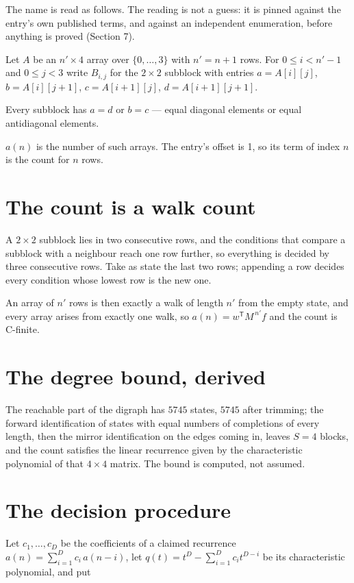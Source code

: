 \documentclass[11pt]{article}
\theoremstyle{definition}
\begin{document}
The name is read as follows. The reading is not a guess: it is pinned against the entry's own published terms, and against an independent enumeration, before anything is proved (Section 7).

Let $A$ be an $n' \times 4$ array over $\{0,\dots,3\}$ with $n' = n + 1$ rows. For $0 \le i < n'-1$ and $0 \le j < 3$ write $B_{i,j}$ for the $2\times2$ subblock with entries $a = A[i][j]$, $b = A[i][j{+}1]$, $c = A[i{+}1][j]$, $d = A[i{+}1][j{+}1]$.

Every subblock has $a = d$ or $b = c$ --- equal diagonal elements or equal antidiagonal elements.

$a(n)$ is the number of such arrays. The entry's offset is 1, so its term of index $n$ is the count for $n$ rows.

\section{The count is a walk count}

A $2\times2$ subblock lies in two consecutive rows, and the conditions that compare a subblock with a neighbour reach one row further, so everything is decided by three consecutive rows. Take as state the last two rows; appending a row decides every condition whose lowest row is the new one.

An array of $n'$ rows is then exactly a walk of length $n'$ from the empty state, and every array arises from exactly one walk, so $a(n) = w^{\mathsf T}M^{\,n'}f$ and the count is C-finite.

\section{The degree bound, derived}

The reachable part of the digraph has $5745$ states, $5745$ after trimming; the forward identification of states with equal numbers of completions of every length, then the mirror identification on the edges coming in, leaves $S = 4$ blocks, and the count satisfies the linear recurrence given by the characteristic polynomial of that $4\times4$ matrix. The bound is computed, not assumed.

\section{The decision procedure}

Let $c_1,\dots,c_D$ be the coefficients of a claimed recurrence $a(n) = \sum_{i=1}^{D} c_i\,a(n-i)$, let $q(t) = t^{D} - \sum_{i=1}^{D} c_i t^{D-i}$ be its characteristic polynomial, and put
\end{document}
